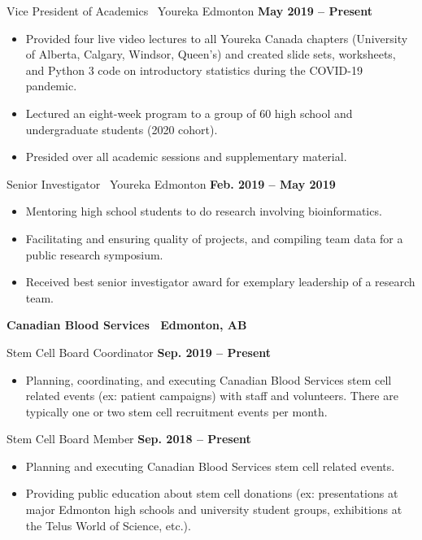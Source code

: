 \documentclass{article}
\begin{document}
    Vice President of Academics \textbar\ Youreka Edmonton \hfill \textbf{May 2019 -- Present}
    \begin{itemize}
        \item Provided four live video lectures to all Youreka Canada chapters (University of Alberta, Calgary, Windsor, Queen's) and created slide sets, worksheets, and Python 3 code on introductory statistics during the COVID-19 pandemic.
        \item Lectured an eight-week program to a group of 60 high school and undergraduate students (2020 cohort).
        \item Presided over all academic sessions and supplementary material.
    \end{itemize}

    Senior Investigator \textbar\ Youreka Edmonton \hfill \textbf{Feb. 2019 -- May 2019}
    \begin{itemize}
        \item Mentoring high school students to do research involving bioinformatics.
        \item Facilitating and ensuring quality of projects, and compiling team data for a public research symposium.
        \item Received best senior investigator award for exemplary leadership of a research team.
    \end{itemize}

    \textbf{Canadian Blood Services \textbar\ Edmonton, AB}

    Stem Cell Board Coordinator \hfill \textbf{Sep. 2019 -- Present}
    \begin{itemize}
        \item Planning, coordinating, and executing Canadian Blood Services stem cell related events (ex: patient campaigns) with staff and volunteers. There are typically one or two stem cell recruitment events per month.
    \end{itemize}

    Stem Cell Board Member \hfill \textbf{Sep. 2018 -- Present}
    \begin{itemize}
        \item Planning and executing Canadian Blood Services stem cell related events.
        \item Providing public education about stem cell donations (ex: presentations at major Edmonton high schools and university student groups, exhibitions at the Telus World of Science, etc.).
    \end{itemize}
\end{document}
